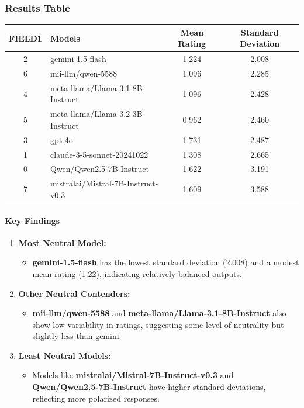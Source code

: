 \documentclass{article}
\begin{document}
\subsubsection{Results Table}
\begin{tabular}{|c|l|c|c|}
\hline
\textbf{FIELD1} & \textbf{Models} & \textbf{Mean Rating} & \textbf{Standard Deviation} \\
\hline
2 & gemini-1.5-flash & 1.224 & 2.008 \\
6 & mii-llm/qwen-5588 & 1.096 & 2.285 \\
4 & meta-llama/Llama-3.1-8B-Instruct & 1.096 & 2.428 \\
5 & meta-llama/Llama-3.2-3B-Instruct & 0.962 & 2.460 \\
3 & gpt-4o & 1.731 & 2.487 \\
1 & claude-3-5-sonnet-20241022 & 1.308 & 2.665 \\
0 & Qwen/Qwen2.5-7B-Instruct & 1.622 & 3.191 \\
7 & mistralai/Mistral-7B-Instruct-v0.3 & 1.609 & 3.588 \\
\hline
\end{tabular}


\paragraph{Key Findings}
\begin{enumerate}
    \item \textbf{Most Neutral Model:}
    \begin{itemize}
        \item \textbf{gemini-1.5-flash} has the lowest standard deviation (2.008) and a modest mean rating (1.22), indicating relatively balanced outputs.
    \end{itemize}
    \item \textbf{Other Neutral Contenders:}
    \begin{itemize}
        \item \textbf{mii-llm/qwen-5588} and \textbf{meta-llama/Llama-3.1-8B-Instruct} also show low variability in ratings, suggesting some level of neutrality but slightly less than gemini.
    \end{itemize}
    \item \textbf{Least Neutral Models:}
    \begin{itemize}
        \item Models like \textbf{mistralai/Mistral-7B-Instruct-v0.3} and \textbf{Qwen/Qwen2.5-7B-Instruct} have higher standard deviations, reflecting more polarized responses.
    \end{itemize}
\end{enumerate}
\end{document}
